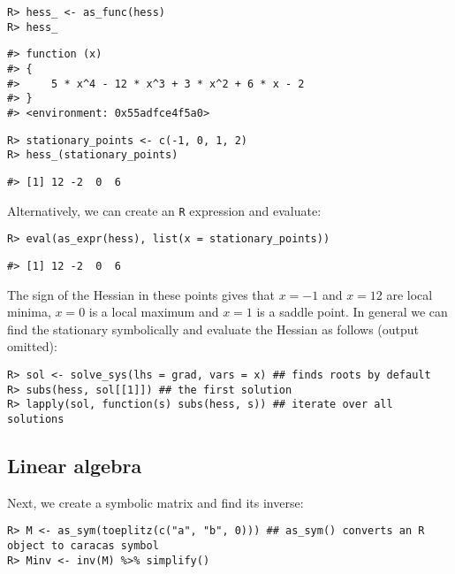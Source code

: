 \begin{verbatim}
R> hess_ <- as_func(hess)
R> hess_
\end{verbatim}

\begin{verbatim}
#> function (x) 
#> {
#>     5 * x^4 - 12 * x^3 + 3 * x^2 + 6 * x - 2
#> }
#> <environment: 0x55adfce4f5a0>
\end{verbatim}

\begin{verbatim}
R> stationary_points <- c(-1, 0, 1, 2)
R> hess_(stationary_points)
\end{verbatim}

\begin{verbatim}
#> [1] 12 -2  0  6
\end{verbatim}

Alternatively, we can create an \texttt{R} expression and evaluate:

\begin{verbatim}
R> eval(as_expr(hess), list(x = stationary_points))
\end{verbatim}

\begin{verbatim}
#> [1] 12 -2  0  6
\end{verbatim}

The sign of the Hessian in these points gives that \(x=-1\) and \(x=12\)
are local minima, \(x=0\) is a local maximum and \(x=1\) is a saddle
point.
In general we can find the stationary symbolically and evaluate the Hessian as follows (output omitted):

\begin{verbatim}
R> sol <- solve_sys(lhs = grad, vars = x) ## finds roots by default
R> subs(hess, sol[[1]]) ## the first solution
R> lapply(sol, function(s) subs(hess, s)) ## iterate over all solutions
\end{verbatim}

\hypertarget{linear-algebra}{%
\subsection{Linear algebra}\label{linear-algebra}}

Next, we create a symbolic matrix and find its inverse:

\begin{verbatim}
R> M <- as_sym(toeplitz(c("a", "b", 0))) ## as_sym() converts an R object to caracas symbol
R> Minv <- inv(M) %>% simplify()
\end{verbatim}

